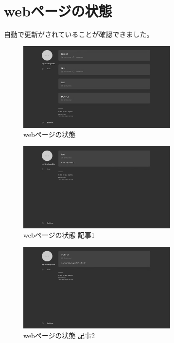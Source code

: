 \section{webページの状態}
  自動で更新がされていることが確認できました。

  \begin{figure}[H]
    \centering
    \includegraphics[width=8cm]{./image/02-chap9/hugo1.png}
    \caption{webページの状態}
    \label{chap9-hugo1-image}
  \end{figure}

  \begin{figure}[H]
    \centering
    \includegraphics[width=8cm]{./image/02-chap9/hugo2.png}
    \caption{webページの状態 記事1}
    \label{chap9-hugo2-image}
  \end{figure}

  \begin{figure}[H]
    \centering
    \includegraphics[width=8cm]{./image/02-chap9/hugo3.png}
    \caption{webページの状態 記事2}
    \label{chap9-hugo3-image}
  \end{figure}
